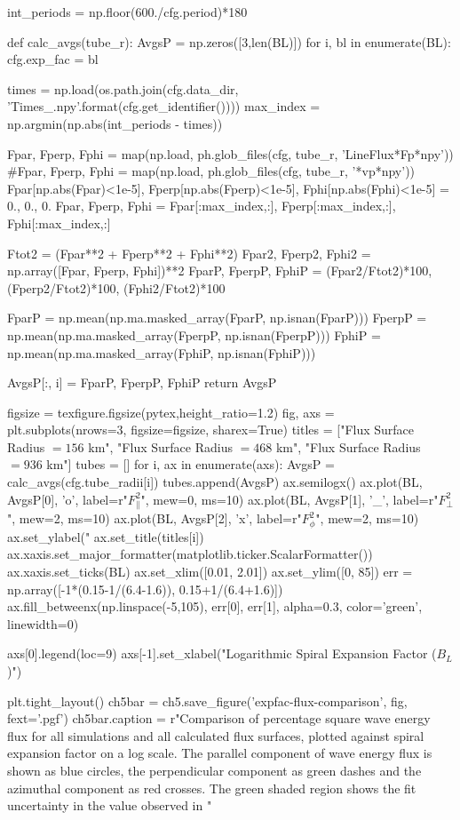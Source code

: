 \begin{pycode}[chapter5]
int_periods = np.floor(600./cfg.period)*180

def calc_avgs(tube_r):
    AvgsP = np.zeros([3,len(BL)])
    for i, bl in enumerate(BL):
        cfg.exp_fac = bl
        
        times = np.load(os.path.join(cfg.data_dir, 'Times_{}.npy'.format(cfg.get_identifier())))
        max_index = np.argmin(np.abs(int_periods - times))
        
        Fpar, Fperp, Fphi = map(np.load, ph.glob_files(cfg, tube_r, 'LineFlux*Fp*npy'))
        #Fpar, Fperp, Fphi = map(np.load, ph.glob_files(cfg, tube_r, '*vp*npy'))
        Fpar[np.abs(Fpar)<1e-5], Fperp[np.abs(Fperp)<1e-5], Fphi[np.abs(Fphi)<1e-5] = 0., 0., 0.
        Fpar, Fperp, Fphi = Fpar[:max_index,:], Fperp[:max_index,:], Fphi[:max_index,:]
        
        Ftot2 = (Fpar**2 + Fperp**2 + Fphi**2)
        Fpar2, Fperp2, Fphi2 = np.array([Fpar, Fperp, Fphi])**2
        FparP, FperpP, FphiP = (Fpar2/Ftot2)*100, (Fperp2/Ftot2)*100, (Fphi2/Ftot2)*100
        
        FparP = np.mean(np.ma.masked_array(FparP, np.isnan(FparP)))
        FperpP = np.mean(np.ma.masked_array(FperpP, np.isnan(FperpP)))
        FphiP = np.mean(np.ma.masked_array(FphiP, np.isnan(FphiP)))
        
        AvgsP[:, i] = FparP, FperpP, FphiP
    return AvgsP

figsize = texfigure.figsize(pytex,height_ratio=1.2)
fig, axs = plt.subplots(nrows=3, figsize=figsize, sharex=True)
titles = ["Flux Surface Radius $=156$ km", "Flux Surface Radius $=468$ km", "Flux Surface Radius $=936$ km"]
tubes = []
for i, ax in enumerate(axs):
    AvgsP = calc_avgs(cfg.tube_radii[i])
    tubes.append(AvgsP)
    ax.semilogx()
    ax.plot(BL, AvgsP[0], 'o', label=r"$F_\parallel^2$", mew=0, ms=10)
    ax.plot(BL, AvgsP[1], '_', label=r"$F_\perp^2$", mew=2, ms=10)
    ax.plot(BL, AvgsP[2], 'x', label=r"$F_\phi^2$", mew=2, ms=10)
    ax.set_ylabel("%
    ax.set_title(titles[i])
    ax.xaxis.set_major_formatter(matplotlib.ticker.ScalarFormatter())
    ax.xaxis.set_ticks(BL)
    ax.set_xlim([0.01, 2.01])
    ax.set_ylim([0, 85])
    err = np.array([-1*(0.15-1/(6.4-1.6)), 0.15+1/(6.4+1.6)])
    ax.fill_betweenx(np.linspace(-5,105), err[0], err[1], alpha=0.3, color='green', linewidth=0)

axs[0].legend(loc=9)
axs[-1].set_xlabel("Logarithmic Spiral Expansion Factor ($B_L$)")

plt.tight_layout()
ch5bar = ch5.save_figure('expfac-flux-comparison', fig, fext='.pgf')
ch5bar.caption = r"Comparison of percentage square wave energy flux for all simulations and all calculated flux surfaces, plotted against spiral expansion factor on a log scale. The parallel component of wave energy flux is shown as blue circles, the perpendicular component as green dashes and the azimuthal component as red crosses. The green shaded region shows the fit uncertainty in the value observed in \citet{bonet2008}"
\end{pycode}

